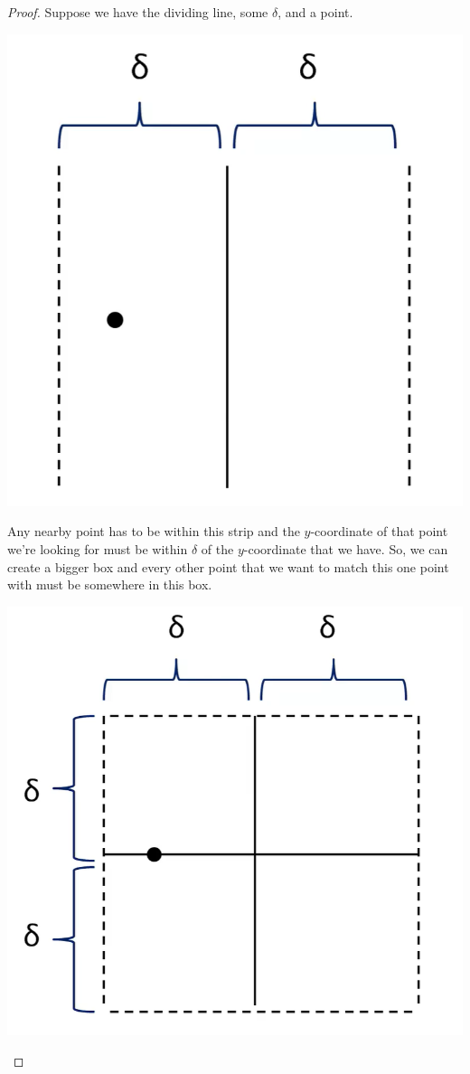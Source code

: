 \documentclass[letterpaper]{article}
\begin{document}
\begin{mdframed}[]
    \begin{proof}
        Suppose we have the dividing line, some $\delta$, and a point.
        \begin{center}
            \includegraphics[scale=0.37]{assets/closest_proof_1.png}
        \end{center}
        Any nearby point has to be within this strip and the $y$-coordinate of that point we're looking for must be within $\delta$ of the $y$-coordinate that we have. So, we can create a bigger box and every other point that we want to match this one point with must be somewhere in this box.
        \begin{center}
            \includegraphics[scale=0.37]{assets/closest_proof_2.png}

\end{center}
\end{proof}
\end{mdframed}
\end{document}
